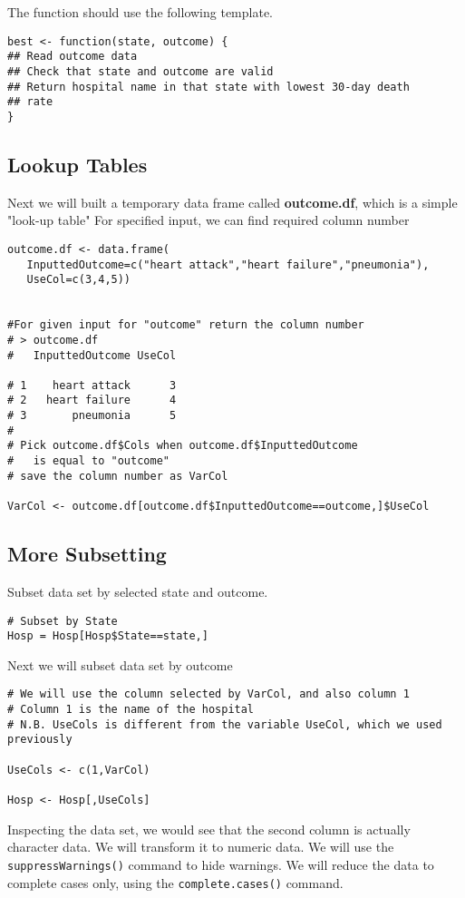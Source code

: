 \documentclass[]{article}
\begin{document}
The function should use the following template.
\begin{verbatim}
best <- function(state, outcome) {
## Read outcome data
## Check that state and outcome are valid
## Return hospital name in that state with lowest 30-day death
## rate
}
\end{verbatim}



\subsection{Lookup Tables}
Next we will built a temporary data frame called \textbf{outcome.df}, which is a simple "look-up table"
For specified input, we can find required column number

\begin{verbatim}
outcome.df <- data.frame(
   InputtedOutcome=c("heart attack","heart failure","pneumonia"),
   UseCol=c(3,4,5))


#For given input for "outcome" return the column number 
# > outcome.df
#   InputtedOutcome UseCol

# 1    heart attack      3
# 2   heart failure      4
# 3       pneumonia      5
#
# Pick outcome.df$Cols when outcome.df$InputtedOutcome 
#   is equal to "outcome"
# save the column number as VarCol

VarCol <- outcome.df[outcome.df$InputtedOutcome==outcome,]$UseCol
\end{verbatim}

\subsection{More Subsetting}

Subset data set by selected state and outcome.
\begin{framed}
\begin{verbatim}
# Subset by State
Hosp = Hosp[Hosp$State==state,]
\end{verbatim}
\end{framed}


Next we will subset data set by outcome

\begin{verbatim}
# We will use the column selected by VarCol, and also column 1
# Column 1 is the name of the hospital
# N.B. UseCols is different from the variable UseCol, which we used previously

UseCols <- c(1,VarCol)

Hosp <- Hosp[,UseCols]
\end{verbatim}
Inspecting the data set, we would see that the second column is actually character data.
We will transform it to numeric data. We will use the \texttt{suppressWarnings()} command to hide warnings.
We will reduce the data to complete cases only, using the \texttt{complete.cases()} command.
\end{document}
